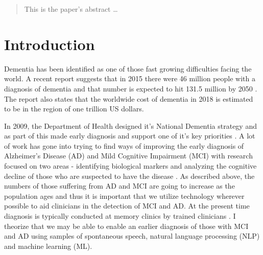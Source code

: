 \documentclass[12pt]{article}
\begin{document}
\maketitle

\begin{abstract}
This is the paper's abstract \ldots
\end{abstract}

\section{Introduction}
Dementia has been identified as one of those fast growing difficulties facing the world. A recent report suggests that in 2015 there were 46 million people with a diagnosis of dementia and that number is expected to hit 131.5 million by 2050 \cite{Prince2015}. The report also states that the worldwide cost of dementia in 2018 is estimated to be in the region of one trillion US dollars.
\par
In 2009, the Department of Health designed it's National Dementia strategy and as part of this made early diagnosis and support one of it's key priorities \cite{England2009}. A lot of work has gone into trying to find ways of improving the early diagnosis of Alzheimer's Disease (AD) and Mild Cognitive Impairment (MCI) with research focused on two areas - identifying biological markers and analyzing the cognitive decline of those who are suspected to have the disease \cite{Taler2008}. As described above, the numbers of those suffering from AD and MCI are going to increase as the population ages \cite{Prince2015} and thus it is important that we utilize technology wherever possible to aid clinicians in the detection of MCI and AD. At the present time diagnosis is typically conducted at memory clinics by trained clinicians \cite{Boschi2017}. I theorize that we may be able to enable an earlier diagnosis of those with MCI and AD using samples of spontaneous speech, natural language processing (NLP) and machine learning (ML).
\par
\end{document}
